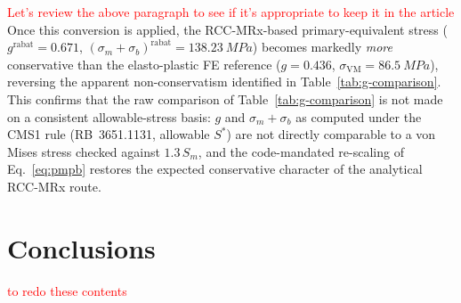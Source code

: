 \documentclass[10pt,a4paper]{article}
\let\oldsection\section
\newif\ifsectionstarted
\renewcommand{\section}{%
  \ifsectionstarted\clearpage\else\global\sectionstartedtrue\FloatBarrier\fi
  \oldsection}
\begin{document}
\textcolor{red}{Let's review the above paragraph to see if it's appropriate to keep it in the article} \\



Once this conversion is applied, the RCC-MRx-based primary-equivalent stress ($g^{\mathrm{rabat}}=0.671$, $(\sigma_m+\sigma_b)^{\mathrm{rabat}}=\SI{138.23}{MPa}$) becomes markedly \emph{more} conservative than the elasto-plastic FE reference ($g=0.436$, $\sigma_{\mathrm{VM}}=\SI{86.5}{MPa}$), reversing the apparent non-conservatism identified in Table~\ref{tab:g-comparison}. This confirms that the raw comparison of Table~\ref{tab:g-comparison} is not made on a consistent allowable-stress basis: $g$ and $\sigma_m+\sigma_b$ as computed under the CMS1 rule (RB~3651.1131, allowable $S^{*}$) are not directly comparable to a von Mises stress checked against $1.3\,S_m$, and the code-mandated re-scaling of Eq.~\eqref{eq:pmpb} restores the expected conservative character of the analytical RCC-MRx route. \\


\newpage


\section{Conclusions}

\textcolor{red}{to redo these contents}
\end{document}

